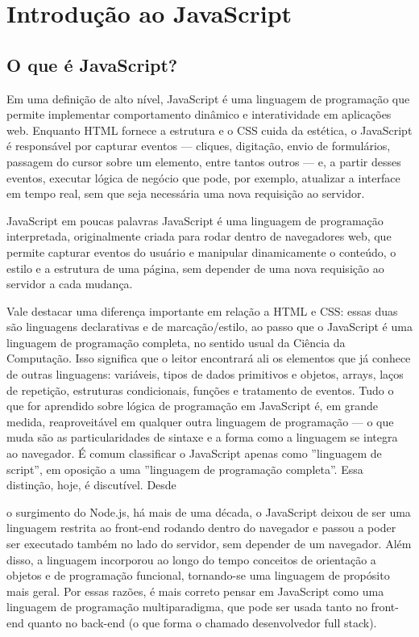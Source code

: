 \chapter{Introdução ao JavaScript}

\section{O que é JavaScript?}

Em uma definição de alto nível, JavaScript é uma linguagem de programação que permite implementar comportamento dinâmico e interatividade em aplicações web. Enquanto HTML fornece a estrutura e o CSS cuida da estética, o JavaScript é responsável por capturar eventos — cliques, digitação, envio de formulários, passagem do cursor sobre um elemento, entre tantos outros — e, a partir desses eventos, executar lógica de negócio que pode, por exemplo, atualizar a interface em tempo real, sem que seja necessária uma nova requisição ao servidor.

\begin{infobox}{JavaScript em poucas palavras}
JavaScript é uma linguagem de programação interpretada, originalmente criada para rodar dentro de navegadores web, que permite capturar eventos do usuário e manipular dinamicamente o conteúdo, o estilo e a estrutura de uma página, sem depender de uma nova requisição ao servidor a cada mudança.
\end{infobox}

Vale destacar uma diferença importante em relação a HTML e CSS: essas duas são linguagens declarativas e de marcação/estilo, ao passo que o JavaScript é uma linguagem de programação completa, no sentido usual da Ciência da Computação. Isso significa que o leitor encontrará ali os elementos que já conhece de outras linguagens: variáveis, tipos de dados primitivos e objetos, arrays, laços de repetição, estruturas condicionais, funções e tratamento de eventos. Tudo o que for aprendido sobre lógica de programação em JavaScript é, em grande medida, reaproveitável em qualquer outra linguagem de programação — o que muda são as particularidades de sintaxe e a forma como a linguagem se integra ao navegador. É comum classificar o JavaScript apenas como ”linguagem de script”, em oposição a uma ”linguagem de programação completa”. Essa distinção, hoje, é discutível. Desde

o surgimento do Node.js, há mais de uma década, o JavaScript deixou de ser uma linguagem restrita ao front-end rodando dentro do navegador e passou a poder ser executado também no lado do servidor, sem depender de um navegador. Além disso, a linguagem incorporou ao longo do tempo conceitos de orientação a objetos e de programação funcional, tornando-se uma linguagem de propósito mais geral. Por essas razões, é mais correto pensar em JavaScript como uma linguagem de programação multiparadigma, que pode ser usada tanto no front-end quanto no back-end (o que forma o chamado desenvolvedor full stack).

